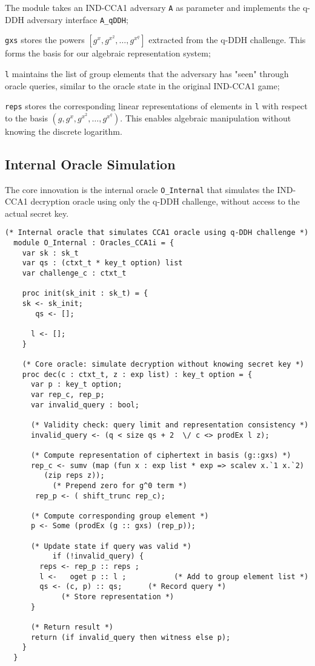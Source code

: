 The module takes an IND-CCA1 adversary \texttt{A} as parameter and implements the q-DDH adversary interface \texttt{A\_qDDH};

\texttt{gxs} stores the powers $[g^x, g^{x^2}, \ldots, g^{x^q}]$ extracted from the q-DDH challenge. This forms the basis for our algebraic representation system;

\texttt{l} maintains the list of group elements that the adversary has "seen" through oracle queries, similar to the oracle state in the original IND-CCA1 game;

\texttt{reps} stores the corresponding linear representations of elements in \texttt{l} with respect to the basis $(g, g^x, g^{x^2}, \ldots, g^{x^q})$. This enables algebraic manipulation without knowing the discrete logarithm.


\subsection{Internal Oracle Simulation}

The core innovation is the internal oracle \texttt{O\_Internal} that simulates the IND-CCA1 decryption oracle using only the q-DDH challenge, without access to the actual secret key.

\begin{lstlisting}[style=easycrypt, caption=Internal Oracle Implementation, breaklines=true, breakatwhitespace=true, frame=single, keepspaces=true]
  (* Internal oracle that simulates CCA1 oracle using q-DDH challenge *)
  module O_Internal : Oracles_CCA1i = {
    var sk : sk_t
    var qs : (ctxt_t * key_t option) list
    var challenge_c : ctxt_t 

    proc init(sk_init : sk_t) = {
    sk <- sk_init;
       qs <- [];
      
      l <- [];
    }

    (* Core oracle: simulate decryption without knowing secret key *)
    proc dec(c : ctxt_t, z : exp list) : key_t option = {
      var p : key_t option;
      var rep_c, rep_p;
      var invalid_query : bool;

      (* Validity check: query limit and representation consistency *)
      invalid_query <- (q < size qs + 2  \/ c <> prodEx l z);

      (* Compute representation of ciphertext in basis (g::gxs) *)
      rep_c <- sumv (map (fun x : exp list * exp => scalev x.`1 x.`2)
         (zip reps z)); 
           (* Prepend zero for g^0 term *)
       rep_p <- ( shift_trunc rep_c); 
      
      (* Compute corresponding group element *)
      p <- Some (prodEx (g :: gxs) (rep_p));
      
      (* Update state if query was valid *)
           if (!invalid_query) {
        reps <- rep_p :: reps ;
        l <-   oget p :: l ;           (* Add to group element list *)
        qs <- (c, p) :: qs;      (* Record query *)
             (* Store representation *)
      }
     
      (* Return result *)
      return (if invalid_query then witness else p);
    }
  }
\end{lstlisting}



